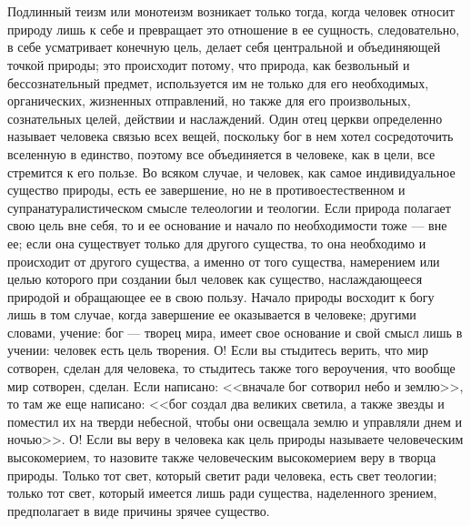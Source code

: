 \documentclass[12pt,oneside]{book}
\begin{document}
\chapter{}

Подлинный теизм или монотеизм возникает только тогда, когда человек относит природу лишь к себе и превращает это отношение в ее сущность, следовательно, в себе усматривает конечную цель, делает себя центральной и объединяющей точкой природы; это происходит потому, что природа, как безвольный и бессознательный предмет, используется им не только для его необходимых, органических, жизненных отправлений, но также для его произвольных, сознательных целей, действии и наслаждений. Один отец церкви определенно называет человека связью всех вещей, поскольку бог в нем хотел сосредоточить вселенную в единство, поэтому все объединяется в человеке, как в цели, все стремится к его пользе. Во всяком случае, и человек, как самое индивидуальное существо природы, есть ее завершение, но не в противоестественном и супранатуралистическом смысле телеологии и теологии. Если природа полагает свою цель вне себя, то и ее основание и начало по необходимости тоже --- вне ее; если она существует только для другого существа, то она необходимо и происходит от другого существа, а именно от того существа, намерением или целью которого при создании был человек как существо, наслаждающееся природой и обращающее ее в свою пользу. Начало природы восходит к богу лишь в том случае, когда завершение ее оказывается в человеке; другими словами, учение: бог --- творец мира, имеет свое основание и свой смысл лишь в учении: человек есть цель творения. О! Если вы стыдитесь верить, что мир сотворен, сделан для человека, то стыдитесь также того вероучения, что вообще мир сотворен, сделан. Если написано: <<вначале бог сотворил небо и землю>>, то там же еще написано: <<бог создал два великих светила, а также звезды и поместил их на тверди небесной, чтобы они освещала землю и управляли днем и ночью>>. О! Если вы веру в человека как цель природы называете человеческим высокомерием, то назовите также человеческим высокомерием веру в творца природы. Только тот свет, который светит ради человека, есть свет теологии; только тот свет, который имеется лишь ради существа, наделенного зрением, предполагает в виде причины зрячее существо.


\chapter{}
\end{document}
